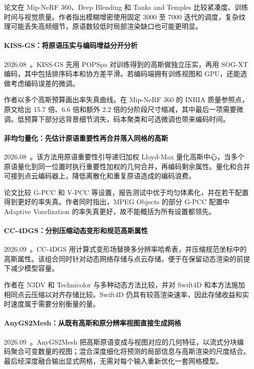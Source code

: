 论文在 Mip-NeRF 360、Deep Blending 和 Tanks and Temples 比较紧凑度、训练时间与视觉质量。作者指出模糊增密使用固定 3000 至 7000 迭代的调度，复杂纹理可能丢失高频细节，原语数较低时局部渲染缺口也可能更明显。

\paragraph{KISS-GS：将原语压实与编码增益分开分析}
2026.08~\cite{2608_26948}。KISS-GS 先用 POPSpa 对训练得到的高斯做独立压实，再用 SOG-XT 编码，其中包括排序码本和协方差平滑。若编码端拥有训练视图和 GPU，还能选做考虑编码误差的微调。

作者以多个高斯预算画出率失真曲线。在 Mip-NeRF 360 的 INRIA 质量参照点，原文给出 15.7 倍、6.6 倍和额外 2.2 倍的分阶段尺寸缩减，其中最后一项需要微调。低预算下部分远背景细节消失，码本聚类和可选微调也带来编码时间。

\paragraph{非均匀量化：先估计原语重要性再合并落入同格的高斯}
2026.08~\cite{2608_28272}。该方法用原语重要性引导递归加权 Lloyd-Max 量化高斯中心，当多个原语量化到同一位置时执行重要性加权的几何合并，再编码剩余属性。量化和合并可接到点云编码器上，降低离散化和重复原语造成的编码浪费。

论文比较 G-PCC 和 V-PCC 等设置，报告测试中优于均匀体素化，并在若干配置得到更好的率失真。作者同时指出，MPEG Objects 的部分 G-PCC 配置中 Adaptive Voxelization 的率失真更好，故不能概括为所有设置都领先。

\paragraph{CC-4DGS：分别压缩动态变形和规范高斯属性}
2026.09~\cite{2609_02184}。CC-4DGS 用计算式变形场替换多分辨率哈希表，并压缩规范坐标中的高斯属性。该组合同时针对动态网络存储与点云存储，便于在保留动态渲染的前提下减少模型容量。

作者在 N3DV 和 Technicolor 与多种动态方法比较，并对 Swift4D 和本方法施加相同点云压缩以对齐存储比较。Swift4D 仍具有较高渲染速率，因此存储收益和实时速度属于需要分别衡量的量。

\paragraph{AnyGS2Mesh：从既有高斯和原分辨率视图直接生成网格}
2026.09~\cite{2609_03304}。AnyGS2Mesh 把高斯原语变成与视图对应的几何特征，以流式分块编码聚合可变数量的视图；混合深度细化将预测的局部信息与高斯渲染的尺度结合。最后经深度融合输出显式网格，无需对每个输入重新优化一套网格模型。

